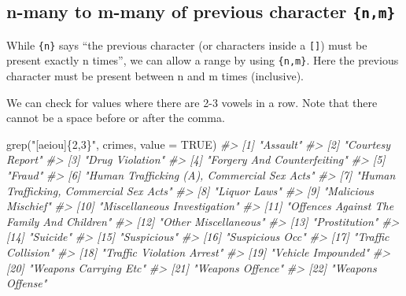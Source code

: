 \documentclass[
]{krantz}
\makeatletter
\newenvironment{Shaded}{\begin{snugshade}}{\end{snugshade}}
\newcommand{\AttributeTok}[1]{\textcolor[rgb]{0.61,0.61,0.61}{#1}}
\newcommand{\CommentTok}[1]{\textcolor[rgb]{0.37,0.37,0.37}{\textit{#1}}}
\newcommand{\ConstantTok}[1]{\textcolor[rgb]{0,0,0}{#1}}
\newcommand{\FunctionTok}[1]{\textcolor[rgb]{0,0,0}{#1}}
\newcommand{\NormalTok}[1]{#1}
\newcommand{\StringTok}[1]{\textcolor[rgb]{0.5,0.5,0.5}{#1}}
\newenvironment{kframe}{%
\medskip{}
\setlength{\fboxsep}{.8em}
 \def\at@end@of@kframe{}%
 \ifinner\ifhmode%
  \def\at@end@of@kframe{\end{minipage}}%
  \begin{minipage}{\columnwidth}%
 \fi\fi%
 \def\FrameCommand##1{\hskip\@totalleftmargin \hskip-\fboxsep
 \colorbox{shadecolor}{##1}\hskip-\fboxsep
     \hskip-\linewidth \hskip-\@totalleftmargin \hskip\columnwidth}%
 \MakeFramed {\advance\hsize-\width
   \@totalleftmargin\z@ \linewidth\hsize
   \@setminipage}}%
 {\par\unskip\endMakeFramed%
 \at@end@of@kframe}
\renewenvironment{Shaded}{\begin{kframe}}{\end{kframe}}
\makeatother
\begin{document}
\hypertarget{n-many-to-m-many-of-previous-character-nm}{%
\subsection{\texorpdfstring{n-many to m-many of previous
character
\texttt{\{n,m\}}}{n-many to m-many of previous character \{n,m\}}}\label{n-many-to-m-many-of-previous-character-nm}}

While \texttt{\{n\}} says ``the previous character (or
characters inside a \texttt{{[}{]}}) must be present exactly
n times'', we can allow a range by using \texttt{\{n,m\}}.
Here the previous character must be present between n and m
times (inclusive).

We can check for values where there are 2-3 vowels in a row.
Note that there cannot be a space before or after the comma.

\begin{Shaded}
\begin{Highlighting}[]
\FunctionTok{grep}\NormalTok{(}\StringTok{"[aeiou]\{2,3\}"}\NormalTok{, crimes, }\AttributeTok{value =} \ConstantTok{TRUE}\NormalTok{)}
\CommentTok{\#\textgreater{}  [1] "Assault"                                   }
\CommentTok{\#\textgreater{}  [2] "Courtesy Report"                           }
\CommentTok{\#\textgreater{}  [3] "Drug Violation"                            }
\CommentTok{\#\textgreater{}  [4] "Forgery And Counterfeiting"                }
\CommentTok{\#\textgreater{}  [5] "Fraud"                                     }
\CommentTok{\#\textgreater{}  [6] "Human Trafficking (A), Commercial Sex Acts"}
\CommentTok{\#\textgreater{}  [7] "Human Trafficking, Commercial Sex Acts"    }
\CommentTok{\#\textgreater{}  [8] "Liquor Laws"                               }
\CommentTok{\#\textgreater{}  [9] "Malicious Mischief"                        }
\CommentTok{\#\textgreater{} [10] "Miscellaneous Investigation"               }
\CommentTok{\#\textgreater{} [11] "Offences Against The Family And Children"  }
\CommentTok{\#\textgreater{} [12] "Other Miscellaneous"                       }
\CommentTok{\#\textgreater{} [13] "Prostitution"                              }
\CommentTok{\#\textgreater{} [14] "Suicide"                                   }
\CommentTok{\#\textgreater{} [15] "Suspicious"                                }
\CommentTok{\#\textgreater{} [16] "Suspicious Occ"                            }
\CommentTok{\#\textgreater{} [17] "Traffic Collision"                         }
\CommentTok{\#\textgreater{} [18] "Traffic Violation Arrest"                  }
\CommentTok{\#\textgreater{} [19] "Vehicle Impounded"                         }
\CommentTok{\#\textgreater{} [20] "Weapons Carrying Etc"                      }
\CommentTok{\#\textgreater{} [21] "Weapons Offence"                           }
\CommentTok{\#\textgreater{} [22] "Weapons Offense"}
\end{Highlighting}
\end{Shaded}
\end{document}
